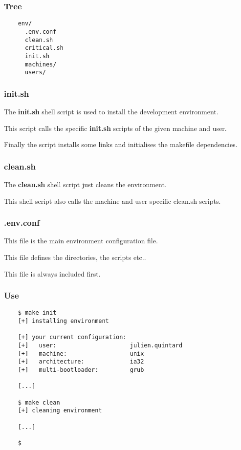 
\begin{frame}[containsverbatim]
  \frametitle{Tree}

  \begin{verbatim}
    env/
      .env.conf
      clean.sh
      critical.sh
      init.sh
      machines/
      users/
  \end{verbatim}
\end{frame}


\begin{frame}
  \frametitle{init.sh}

  The \textbf{init.sh} shell script is used to install the development
  environment.

  \nl

  This script calls the specific \textbf{init.sh} scripts of the given
  machine and user.

  \nl

  Finally the script installs some links and initialises the makefile
  dependencies.
\end{frame}


\begin{frame}
  \frametitle{clean.sh}

  The \textbf{clean.sh} shell script just cleans the environment.

  \nl

  This shell script also calls the machine and user specific clean.sh scripts.
\end{frame}


\begin{frame}
  \frametitle{.env.conf}

  This file is the main environment configuration file.

  \nl

  This file defines the directories, the scripts etc..

  \nl

  This file is always included first.
\end{frame}


\begin{frame}[containsverbatim]
  \frametitle{Use}

  \begin{verbatim}
    $ make init
    [+] installing environment

    [+] your current configuration:
    [+]   user:                     julien.quintard
    [+]   machine:                  unix
    [+]   architecture:             ia32
    [+]   multi-bootloader:         grub

    [...]

    $ make clean
    [+] cleaning environment

    [...]

    $
  \end{verbatim}
\end{frame}

